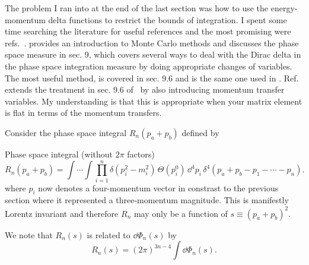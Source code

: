 \label{subsec:recursive-relation}
The problem I ran into at the end of the last section was how to use the energy-momentum delta functions to restrict the bounds of integration. 
I spent some time searching the literature for useful references and the most promising were refs.~\cite{James:1968gu,Byckling:1969sx,Isaacson:2021xty}.
\cite{James:1968gu} provides an introduction to Monte Carlo methods and discusses the phase space measure in sec. 9, which covers several ways to deal with the Dirac delta in the phase space integration measure by doing appropriate changes of variables.
The most useful method, is covered in sec. 9.6 and is the same one used in \cite{Byckling:1969sx}. 
Ref.~\cite{Byckling:1969sx} extends the treatment in sec. 9.6 of~\cite{James:1968gu} by also introducing momentum transfer variables. 
My understanding is that this is appropriate when your matrix element is flat in terms of the momentum transfers.

Consider the phase space integral $R_n(p_a + p_b)$ defined by
\begin{bluenv}{Phase space integral (without $2 \pi$ factors)}
    \vspace{-3ex}
    \begin{equation}
        \label{eq:phase-space-integral-without-2pi}
        R_n(p_a + p_b) = 
        \int \cdots \int \prod_{i=1}^{n} \delta (p_i^2 - m_i^2) \, \Theta(p_i^0) \, 
        \dd^4 p_i \, \delta^4(p_a + p_b - p_1 - \cdots - p_n).
    \end{equation}
    where $p_i$ now denotes a four-momentum vector in constrast to the previous section where it represented a three-momentum magnitude.
    This is manifestly Lorentz invariant and therefore $R_n$ may only be a function of $s \equiv (p_a + p_b)^2$. 
\end{bluenv}


We note that $R_n(s)$ is related to $\dd \Phi_n(s)$ by
\begin{equation}
    R_n(s) = (2\pi)^{3n - 4} \int  \dd \Phi_n(s).
\end{equation} 


